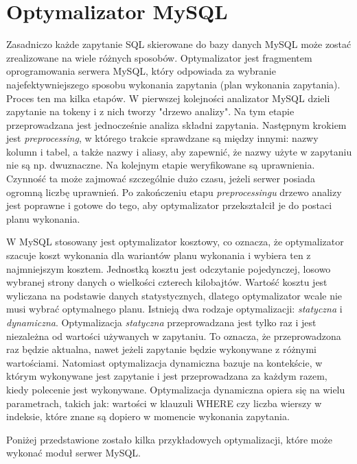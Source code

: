 \section{Optymalizator MySQL}

Zasadniczo każde zapytanie SQL skierowane do bazy danych MySQL może zostać zrealizowane na wiele różnych sposobów. Optymalizator jest fragmentem oprogramowania serwera MySQL, który odpowiada za wybranie najefektywniejszego sposobu wykonania zapytania (plan wykonania zapytania).
Proces ten ma kilka etapów. W pierwszej kolejności analizator MySQL dzieli zapytanie na tokeny i z nich tworzy "drzewo analizy". Na tym etapie przeprowadzana jest jednocześnie analiza składni zapytania. Następnym krokiem jest \textit{preprocessing}, w którego trakcie sprawdzane są między innymi: nazwy kolumn i tabel, a także nazwy i aliasy, aby zapewnić, że nazwy użyte w zapytaniu nie są np. dwuznaczne. Na kolejnym etapie weryfikowane są uprawnienia. Czynność ta może zajmować szczególnie dużo czasu, jeżeli serwer posiada ogromną liczbę uprawnień. Po zakończeniu etapu \textit{preprocessingu} drzewo analizy jest poprawne i gotowe do tego, aby optymalizator przekształcił je do postaci planu wykonania.

W MySQL stosowany jest optymalizator kosztowy, co oznacza, że optymalizator szacuje koszt wykonania dla wariantów planu wykonania i wybiera ten z najmniejszym kosztem. Jednostką kosztu jest odczytanie pojedynczej, losowo wybranej strony danych o wielkości czterech kilobajtów. Wartość kosztu jest wyliczana na podstawie danych statystycznych, dlatego optymalizator wcale nie musi wybrać optymalnego planu. Istnieją dwa rodzaje optymalizacji: \textit{statyczna} i \textit{dynamiczna}. Optymalizacja \textit{statyczna} przeprowadzana jest tylko raz i jest niezależna od wartości używanych w zapytaniu. To oznacza, że przeprowadzona raz będzie aktualna, nawet jeżeli zapytanie będzie wykonywane z różnymi wartościami. Natomiast optymalizacja dynamiczna bazuje na kontekście, w którym wykonywane jest zapytanie i jest przeprowadzana za każdym razem, kiedy polecenie jest wykonywane. Optymalizacja dynamiczna opiera się na wielu parametrach, takich jak: wartości w klauzuli WHERE czy liczba wierszy w indeksie, które znane są dopiero w momencie wykonania zapytania.

Poniżej przedstawione zostało kilka przykładowych optymalizacji, które może wykonać moduł serwer MySQL.

